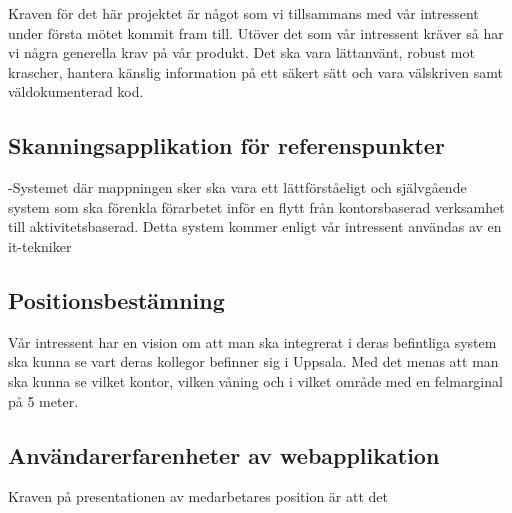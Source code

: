 \documentclass[swedish, a4paper,12pt]{article}
\begin{document}
%
%
%
%
%
Kraven för det här projektet är något som vi tillsammans med vår intressent under första mötet kommit fram till. Utöver det som vår intressent kräver så har vi några generella krav på vår produkt. Det ska vara lättanvänt, robust mot krascher, hantera känslig information på ett säkert sätt och vara välskriven samt väldokumenterad kod.

\subsection{Skanningsapplikation för referenspunkter}
-Systemet där mappningen sker ska vara ett lättförståeligt och självgående system som ska förenkla förarbetet inför en flytt från kontorsbaserad verksamhet till aktivitetsbaserad. Detta system kommer enligt vår intressent användas av en it-tekniker %

\subsection{Positionsbestämning}
Vår intressent har en vision om att man ska integrerat i deras befintliga system ska kunna se vart deras kollegor befinner sig i Uppsala. Med det menas att man ska kunna se vilket kontor, vilken våning och i vilket område med en felmarginal på 5 meter. %

\subsection{Användarerfarenheter av webapplikation}
Kraven på presentationen av medarbetares position är att det %
\end{document}
